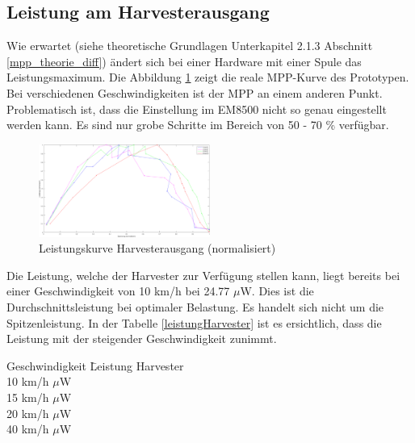 \subsection{Leistung am Harvesterausgang}

Wie erwartet (siehe theoretische Grundlagen Unterkapitel 2.1.3 Abschnitt \ref{mpp_theorie_diff}) ändert sich bei einer Hardware mit einer Spule das Leistungsmaximum. Die Abbildung \ref{mpp_resultat_harvester} zeigt die reale MPP-Kurve des Prototypen. Bei verschiedenen Geschwindigkeiten ist der MPP an einem anderen Punkt. Problematisch ist, dass die Einstellung im EM8500 nicht so genau eingestellt werden kann. Es sind nur grobe Schritte im Bereich von 50 - 70 \% verfügbar. 

\begin{figure}[ht]
    \includegraphics[width=0.5\textwidth]{4Resultate/imag/MPPHarvester.png} 
    \caption{Leistungskurve Harvesterausgang (normalisiert)}
    \label{mpp_resultat_harvester}
\end{figure}

Die Leistung, welche der Harvester zur Verfügung stellen kann, liegt bereits bei einer Geschwindigkeit von 10 km/h bei 24.77 $\mu$W. Dies ist die Durchschnittsleistung bei optimaler Belastung. Es handelt sich nicht um die Spitzenleistung. In der Tabelle \ref{leistungHarvester} ist es ersichtlich, dass die Leistung mit der steigender Geschwindigkeit zunimmt.

\begin{minipage}{\textwidth}
    \label{leistungHarvester}
    \begin{tabbing}
        Geschwindigkeit \quad\= Leistung Harvester \\[0.8ex]
        10 km/h    $\mu$W \\
        15 km/h    $\mu$W \\
        20 km/h  $\mu$W \\
        40 km/h  $\mu$W \\
    \end{tabbing}
\end{minipage}

